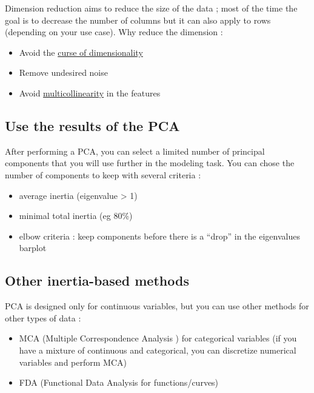 \documentclass[
]{book}
\providecommand{\tightlist}{%
  \setlength{\itemsep}{0pt}\setlength{\parskip}{0pt}}
\begin{document}
Dimension reduction aims to reduce the size of the data ; most of the time the goal is to decrease the number of columns but it can also apply to rows (depending on your use case). Why reduce the dimension :

\begin{itemize}
\tightlist
\item
  Avoid the \href{https://en.wikipedia.org/wiki/Curse_of_dimensionality}{curse of dimensionality}
\item
  Remove undesired noise
\item
  Avoid \href{https://en.wikipedia.org/wiki/Multicollinearity}{multicollinearity} in the features
\end{itemize}

\hypertarget{use-the-results-of-the-pca}{%
\subsection{Use the results of the PCA}\label{use-the-results-of-the-pca}}

After performing a PCA, you can select a limited number of principal components that you will use further in the modeling task. You can chose the number of components to keep with several criteria :

\begin{itemize}
\tightlist
\item
  average inertia (eigenvalue \textgreater{} 1)
\item
  minimal total inertia (eg 80\%)
\item
  elbow criteria : keep components before there is a ``drop'' in the eigenvalues barplot
\end{itemize}

\hypertarget{other-inertia-based-methods}{%
\subsection{Other inertia-based methods}\label{other-inertia-based-methods}}

PCA is designed only for continuous variables, but you can use other methods for other types of data :

\begin{itemize}
\tightlist
\item
  MCA (Multiple Correspondence Analysis ) for categorical variables (if you have a mixture of continuous and categorical, you can discretize numerical variables and perform MCA)
\item
  FDA (Functional Data Analysis for functions/curves)
\end{itemize}
\end{document}
